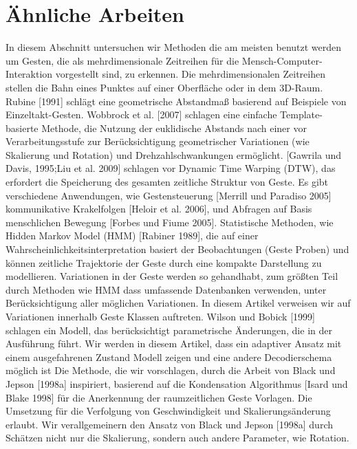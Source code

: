 \documentclass{llncs}
\begin{document}
\section{Ähnliche Arbeiten}
In diesem Abschnitt untersuchen wir Methoden die am meisten benutzt werden um Gesten, die als mehrdimensionale Zeitreihen für die Mensch-Computer-Interaktion vorgestellt sind, zu erkennen. Die mehrdimensionalen Zeitreihen stellen die Bahn eines Punktes auf einer Oberfläche oder in dem 3D-Raum. 
Rubine [1991] schlägt eine geometrische Abstandmaß basierend auf Beispiele von Einzeltakt-Gesten. Wobbrock et al. [2007] schlagen eine einfache Template-basierte Methode, die Nutzung der euklidische Abstands nach einer vor Verarbeitungsstufe zur Berücksichtigung geometrischer Variationen (wie Skalierung und Rotation) und Drehzahlschwankungen ermöglicht.
[Gawrila und Davis, 1995;Liu et al. 2009] schlagen vor Dynamic Time Warping (DTW), das erfordert die Speicherung des gesamten zeitliche Struktur von Geste. Es gibt verschiedene Anwendungen, wie Gestensteuerung [Merrill und Paradiso 2005] kommunikative Krakelfolgen [Heloir et al. 2006], und Abfragen auf Basis menschlichen Bewegung [Forbes und Fiume 2005]. 
Statistische Methoden, wie Hidden Markov Model (HMM) [Rabiner 1989], die  auf einer Wahrscheinlichkeitsinterpretation basiert der Beobachtungen (Geste Proben) und können zeitliche Trajektorie der Geste durch eine kompakte Darstellung zu modellieren. 
Variationen in der Geste werden so gehandhabt, zum größten Teil durch Methoden wie HMM dass umfassende Datenbanken verwenden, unter Berücksichtigung aller möglichen Variationen. 
In diesem Artikel verweisen wir auf Variationen innerhalb Geste Klassen auftreten. Wilson und Bobick [1999] schlagen ein Modell, das berücksichtigt parametrische Änderungen, die in der Ausführung führt.
Wir werden in diesem Artikel, dass ein adaptiver Ansatz mit einem ausgefahrenen Zustand Modell zeigen und eine andere Decodierschema möglich ist
Die Methode, die wir vorschlagen, durch die Arbeit von Black und Jepson [1998a] inspiriert, basierend auf die Kondensation Algorithmus [Isard und Blake 1998] für die Anerkennung der raumzeitlichen Geste Vorlagen. Die Umsetzung für die Verfolgung von Geschwindigkeit und Skalierungsänderung erlaubt. Wir verallgemeinern den Ansatz von Black und Jepson [1998a] durch Schätzen nicht nur die Skalierung, sondern auch andere Parameter, wie Rotation.
\end{document}
